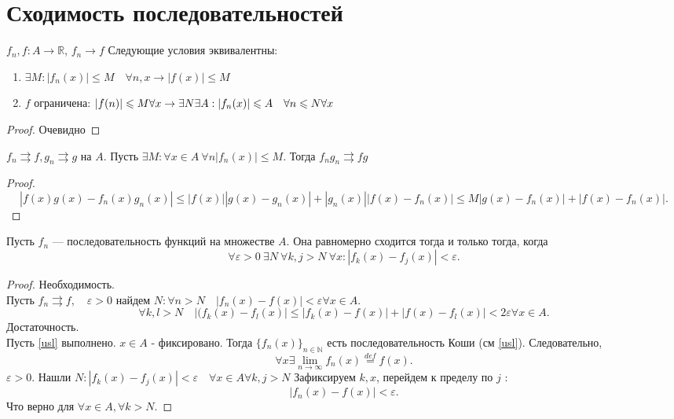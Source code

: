 \documentclass[11pt]{book}
\newcommand{\N}{\mathbb{N}}
\newcommand{\R}{\mathbb{R}}
\renewcommand{\le}{\leqslant}
\theoremstyle{definition}
\theoremstyle{plain}
\theoremstyle{plain}
\theoremstyle{definition}
\theoremstyle{remark}
\begin{document}
\section{Сходимость последовательностей}
\begin{thm}
    $f_n, f : A \to  \R$, $f_n \to  f$
    Следующие условия эквивалентны:
    \begin{enumerate}
	\item $\exists M : |f_n(x)| \le  M \quad \forall  n, x \longrightarrow |f(x)| \le  M$
	\item $f$ ограничена: $|f(n)| \le  M \forall  x \to \exists  N \exists  A: \\
	    |f_n(x)| \le A \quad \forall  n \le  N \forall  x$
    \end{enumerate}
\end{thm}
\begin{proof}
    Очевидно
\end{proof}
\begin{thm}
    $f_n \rightrightarrows  f, g_n \rightrightarrows  g$ на $A$.
    Пусть $\exists M: \forall x \in A ~\forall  n |f_n(x) | \le  M$. Тогда  $f_n g_n \rightrightarrows fg$
\end{thm}
\begin{proof}
    \[
	|f(x) g(x) - f_n(x) g_n(x)| \le  |f(x) ||g(x) - g_n(x) | + | g_n(x)| |f(x) - f_n(x)| \le  M | g(x) - f_n(x)  |+ | f(x) - f_n(x)|
    .\]
\end{proof}
\begin{thm}
    Пусть $f_n$ --- последовательность функций на множестве $A$. Она равномерно сходится  тогда и только тогда, когда
    \[
	\forall  \varepsilon >0~ \exists  N ~ \forall  k, j> N~ \forall x : |f_k(x) - f_j(x)| < \varepsilon
    .\] \label{usl}
\end{thm}
\begin{proof}
    Необходимость.\\
    Пусть $f_n \rightrightarrows  f, \quad \varepsilon  >0$ найдем $N: \forall  n > N \quad |f_n(x) - f(x)| < \varepsilon  \forall x\in A$.
    \[
	\forall k, l > N \quad |(f_k(x) - f_l(x)| \le |f_k(x) -f(x)| + |f(x) - f_l(x)| < 2 \varepsilon  \forall x \in A
    .\]
    Достаточность.\\
    Пусть  \ref{usl} выполнено. $x \in A$ - фиксировано.
    Тогда $\{f_n(x)\}_{n \in  \N}$ есть последовательность Коши (см \ref{usl}). Следовательно,
    \[
	\forall  x \exists \lim_{n \to  \infty} f_n(x) \stackrel{def} = f(x)
    .\]
    $ \varepsilon  >0$. Нашли $N: |f_k(x) - f_j(x)| < \varepsilon  \quad \forall  x \in A \forall  k, j > N$
    Зафиксируем $k, x$, перейдем к пределу по $j$ :
    \[
	|f_n(x) - f(x) | < \varepsilon
    .\]
    Что верно для $ \forall  x \in  A, \forall  k > N$.
\end{proof}
\end{document}
